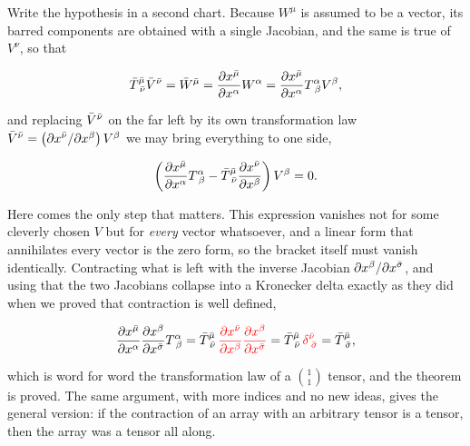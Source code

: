         Write the hypothesis in a second chart. Because $W^{\mu}$ is assumed to be a vector, its barred components are obtained with a single Jacobian, and the same is true of $V^{\nu}$, so that

        \begin{align*}
            \Bar{T}^{\Bar{\mu}}_{\;\Bar{\nu}}\Bar{V}^{\Bar{\nu}} = \Bar{W}^{\Bar{\mu}} = \frac{\partial x^{\Bar{\mu}}}{\partial x^{\alpha}}W^{\alpha} = \frac{\partial x^{\Bar{\mu}}}{\partial x^{\alpha}}T^{\alpha}_{\;\beta}V^{\beta},
        \end{align*}

        and replacing $\Bar{V}^{\Bar{\nu}}$ on the far left by its own transformation law $\Bar{V}^{\Bar{\nu}} = \left(\partial x^{\Bar{\nu}}/\partial x^{\beta}\right)V^{\beta}$ we may bring everything to one side,

        \begin{align*}
            \left(\frac{\partial x^{\Bar{\mu}}}{\partial x^{\alpha}}T^{\alpha}_{\;\beta} - \Bar{T}^{\Bar{\mu}}_{\;\Bar{\nu}}\frac{\partial x^{\Bar{\nu}}}{\partial x^{\beta}}\right)V^{\beta} = 0.
        \end{align*}

        Here comes the only step that matters. This expression vanishes not for some cleverly chosen $V$ but for \textit{every} vector whatsoever, and a linear form that annihilates every vector is the zero form, so the bracket itself must vanish identically. Contracting what is left with the inverse Jacobian $\partial x^{\beta}/\partial x^{\Bar{\sigma}}$, and using that the two Jacobians collapse into a Kronecker delta exactly as they did when we proved that contraction is well defined,

        \begin{align*}
            \frac{\partial x^{\Bar{\mu}}}{\partial x^{\alpha}}\frac{\partial x^{\beta}}{\partial x^{\Bar{\sigma}}}T^{\alpha}_{\;\beta} = \Bar{T}^{\Bar{\mu}}_{\;\Bar{\nu}}\,{\color{red}\frac{\partial x^{\Bar{\nu}}}{\partial x^{\beta}}\frac{\partial x^{\beta}}{\partial x^{\Bar{\sigma}}}} = \Bar{T}^{\Bar{\mu}}_{\;\Bar{\nu}}\,{\color{red}\delta^{\Bar{\nu}}_{\;\Bar{\sigma}}} = \Bar{T}^{\Bar{\mu}}_{\;\Bar{\sigma}},
        \end{align*}

        which is word for word the transformation law of a $\binom{1}{1}$ tensor, and the theorem is proved. The same argument, with more indices and no new ideas, gives the general version: if the contraction of an array with an arbitrary tensor is a tensor, then the array was a tensor all along.

